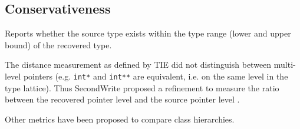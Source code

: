 
\subsection{Conservativeness}

Reports whether the source type exists within the type range (lower and upper bound) of the recovered type.

The distance measurement as defined by TIE did not distinguish between multi-level pointers (e.g. \texttt{int*} and \texttt{int**} are equivalent, i.e. on the same level in the type lattice). Thus SecondWrite proposed a refinement to measure the ratio between the recovered pointer level and the source pointer level \cite{second_write_scalable_type_detection}.

Other metrics have been proposed to compare class hierarchies.
